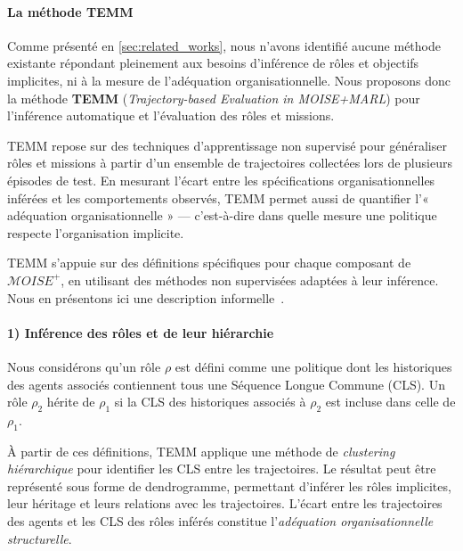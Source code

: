 \paragraph{La méthode TEMM}
\label{sec:TEMM_algorithm}

Comme présenté en \autoref{sec:related_works}, nous n'avons identifié aucune méthode existante répondant pleinement aux besoins d'inférence de rôles et objectifs implicites, ni à la mesure de l'adéquation organisationnelle. Nous proposons donc la méthode \textbf{TEMM} (\textit{Trajectory-based Evaluation in MOISE+MARL}) pour l'inférence automatique et l'évaluation des rôles et missions.

TEMM repose sur des techniques d'apprentissage non supervisé pour généraliser rôles et missions à partir d'un ensemble de trajectoires collectées lors de plusieurs épisodes de test. En mesurant l'écart entre les spécifications organisationnelles inférées et les comportements observés, TEMM permet aussi de quantifier l'« adéquation organisationnelle » — c'est-à-dire dans quelle mesure une politique respecte l'organisation implicite.

TEMM s'appuie sur des définitions spécifiques pour chaque composant de $\mathcal{M}OISE^+$, en utilisant des méthodes non supervisées adaptées à leur inférence. Nous en présentons ici une description informelle~\hyperref[fn:github]{\footnotemark[1]}.
%

\paragraph{1) Inférence des rôles et de leur hiérarchie}

Nous considérons qu'un rôle $\rho$ est défini comme une politique dont les historiques des agents associés contiennent tous une Séquence Longue Commune (CLS). Un rôle $\rho_2$ hérite de $\rho_1$ si la CLS des historiques associés à $\rho_2$ est incluse dans celle de $\rho_1$.

À partir de ces définitions, TEMM applique une méthode de \textit{clustering hiérarchique} pour identifier les CLS entre les trajectoires. Le résultat peut être représenté sous forme de dendrogramme, permettant d'inférer les rôles implicites, leur héritage et leurs relations avec les trajectoires.  
L'écart entre les trajectoires des agents et les CLS des rôles inférés constitue l'\textit{adéquation organisationnelle structurelle}.

